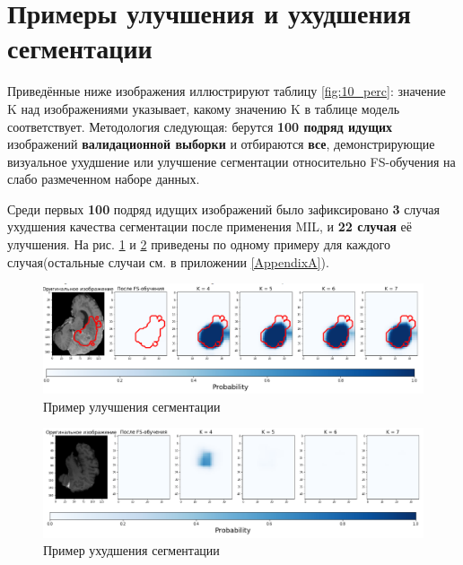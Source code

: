 \newpage
\section{Примеры улучшения и ухудшения сегментации}

Приведённые ниже изображения иллюстрируют таблицу \ref{fig:10_perc}: значение K над изображениями указывает, какому значению K в таблице модель соответствует. Методология следующая: берутся {\bf 100 подряд идущих} изображений {\bf валидационной выборки} и отбираются {\bf все}, демонстрирующие визуальное ухудшение или улучшение сегментации относительно FS-обучения на слабо размеченном наборе данных. 

Среди первых {\bf 100} подряд идущих изображений было зафиксировано {\bf 3} случая ухудшения качества сегментации после применения MIL, и {\bf 22 случая} её улучшения. На рис. \ref{fig:better} и \ref{fig:worse}  приведены по одному примеру для каждого случая(остальные случаи см. в приложении \ref{AppendixA}).


 \begin{figure}[h!] 
  \center
  \includegraphics [scale=0.7] {images/good_22.png}
  \caption{Пример улучшения сегментации}
  \label{fig:better}
\end{figure}

\begin{figure}[h!] 
  \center
  \includegraphics [scale=0.7] {images/bad_3.png}
  \caption{Пример ухудшения сегментации}
  \label{fig:worse}
\end{figure}



\clearpage